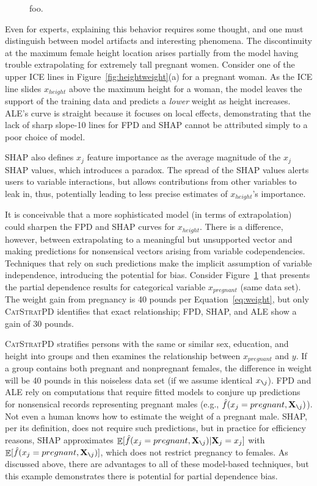 \documentclass{article}
\renewcommand{\eqref}[1]{Equation~\ref{#1}}
\newcommand{\figref}[1]{Figure~\ref{#1}}
\newcommand{\cspd}{\fontfamily{cmr}\textsc{\small CatStratPD}}
\newcommand{\xnj}{$x_{\texttt{\char`\\} j}$}
\renewcommand{\slash}{\texttt{\char`\\}}
\DeclareMathOperator{\Ex}{\mathbb{E}}
\begin{document}
\begin{figure}[htbp]
\begin{center}
\caption{\small foo.}
\label{fig:pregnant}
\end{center}
\end{figure}

Even for experts, explaining this behavior requires some thought, and one must distinguish between model artifacts and interesting phenomena. The discontinuity at the maximum female height location arises partially from the model having trouble extrapolating for extremely tall pregnant women. Consider one of the upper ICE lines in \figref{fig:heightweight}(a) for a pregnant woman. As the ICE line slides $x_{height}$ above the maximum height for a woman, the model leaves the support of the training data and predicts a {\em lower} weight as height increases. ALE's curve is straight because it focuses on local effects, demonstrating that the lack of sharp slope-10 lines for FPD and SHAP cannot be attributed simply to a poor choice of model.  

SHAP also defines $x_j$ feature importance as the average magnitude of the $x_j$ SHAP values, which introduces a paradox.  The spread of the SHAP values alerts users to variable interactions, but allows contributions from other variables to leak in, thus, potentially leading to less precise estimates of $x_{height}$'s importance.

It is conceivable that a more sophisticated model (in terms of extrapolation) could sharpen the FPD and SHAP curves for $x_{height}$. There is a difference, however, between extrapolating to a meaningful but unsupported vector and making predictions for nonsensical vectors arising from variable codependencies.  Techniques that rely on such predictions make the implicit assumption of variable independence, introducing the potential for bias. Consider \figref{fig:pregnant} that presents the partial dependence results for categorical variable $x_{pregnant}$ (same data set). The weight gain from pregnancy is 40 pounds per \eqref{eq:weight}, but only \cspd{} identifies that exact relationship; FPD, SHAP, and ALE show a gain of 30 pounds. 

\cspd{} stratifies persons with the same or similar sex, education, and height into groups and then examines the relationship between $x_{pregnant}$ and $y$. If a group contains both pregnant and nonpregnant females, the difference in weight will be 40 pounds in this noiseless data set (if we assume identical \xnj).  FPD and ALE rely on computations that require fitted models to conjure up predictions for nonsensical records representing pregnant males (e.g., $\hat{f}(x_j = pregnant, {\bf X}_{\slash j})$). Not even a human knows how to estimate the weight of a pregnant male. SHAP, per its definition, does not require such predictions, but in practice for efficiency reasons, SHAP approximates $\Ex[\hat{f}(x_{j} = pregnant,{\bf X}_{\slash j}) | {\bf X}_j = x_j]$ with $\Ex[\hat{f}(x_{j} = pregnant,{\bf X}_{\slash j})]$, which does not restrict pregnancy to females. As discussed above, there are advantages to all of these model-based techniques, but this example demonstrates there is potential for partial dependence bias.
\end{document}
